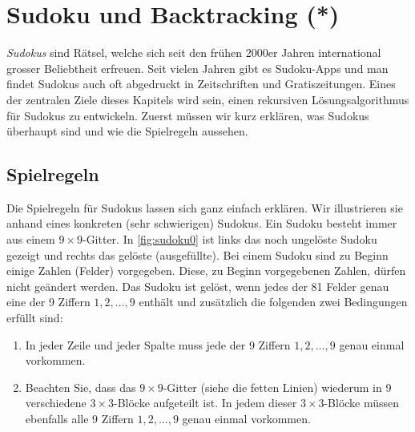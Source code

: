 \chapter{Sudoku und Backtracking (*)}\label{ch:Kapitel06}
\textit{Sudokus} sind Rätsel, welche sich seit den frühen 2000er Jahren international grosser Beliebtheit erfreuen. Seit vielen Jahren gibt es Sudoku-Apps und man findet Sudokus auch oft abgedruckt in Zeitschriften und Gratiszeitungen. Eines der zentralen Ziele dieses Kapitels wird sein, einen rekursiven Lösungsalgorithmus für Sudokus zu entwickeln. Zuerst müssen wir kurz erklären, was Sudokus überhaupt sind und wie die Spielregeln aussehen.

\section{Spielregeln}
 Die Spielregeln für Sudokus lassen sich ganz einfach erklären. Wir illustrieren sie anhand eines konkreten (sehr schwierigen) Sudokus. Ein Sudoku besteht immer aus einem $9\times 9$-Gitter. In \cref{fig:sudoku0} ist links das noch ungelöste Sudoku gezeigt und rechts das gelöste (ausgefüllte). Bei einem Sudoku sind zu Beginn einige Zahlen (Felder) vorgegeben. Diese, zu Beginn vorgegebenen Zahlen, dürfen nicht geändert werden. Das Sudoku ist gelöst, wenn jedes der 81 Felder genau eine der 9 Ziffern $1,2,\ldots, 9$ enthält und zusätzlich die folgenden zwei Bedingungen erfüllt sind:
\begin{enumerate}
\item In jeder Zeile und jeder Spalte muss jede der 9 Ziffern $1,2,\ldots, 9$ genau einmal vorkommen.
\item Beachten Sie, dass das $9\times 9$-Gitter (siehe die fetten Linien) wiederum in 9 verschiedene $3\times 3$-Blöcke aufgeteilt ist. In jedem dieser $3\times 3$-Blöcke müssen ebenfalls alle 9 Ziffern $1,2,\ldots, 9$ genau einmal vorkommen.
\end{enumerate}


